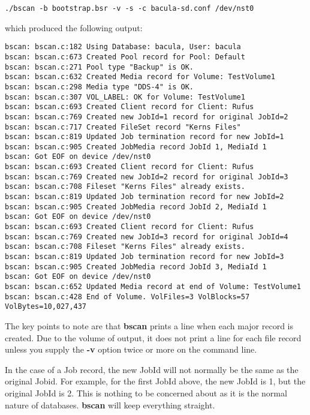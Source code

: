 \footnotesize
\begin{verbatim}
./bscan -b bootstrap.bsr -v -s -c bacula-sd.conf /dev/nst0
\end{verbatim}
\normalsize

which produced the following output:

\footnotesize
\begin{verbatim}
bscan: bscan.c:182 Using Database: bacula, User: bacula
bscan: bscan.c:673 Created Pool record for Pool: Default
bscan: bscan.c:271 Pool type "Backup" is OK.
bscan: bscan.c:632 Created Media record for Volume: TestVolume1
bscan: bscan.c:298 Media type "DDS-4" is OK.
bscan: bscan.c:307 VOL_LABEL: OK for Volume: TestVolume1
bscan: bscan.c:693 Created Client record for Client: Rufus
bscan: bscan.c:769 Created new JobId=1 record for original JobId=2
bscan: bscan.c:717 Created FileSet record "Kerns Files"
bscan: bscan.c:819 Updated Job termination record for new JobId=1
bscan: bscan.c:905 Created JobMedia record JobId 1, MediaId 1
bscan: Got EOF on device /dev/nst0
bscan: bscan.c:693 Created Client record for Client: Rufus
bscan: bscan.c:769 Created new JobId=2 record for original JobId=3
bscan: bscan.c:708 Fileset "Kerns Files" already exists.
bscan: bscan.c:819 Updated Job termination record for new JobId=2
bscan: bscan.c:905 Created JobMedia record JobId 2, MediaId 1
bscan: Got EOF on device /dev/nst0
bscan: bscan.c:693 Created Client record for Client: Rufus
bscan: bscan.c:769 Created new JobId=3 record for original JobId=4
bscan: bscan.c:708 Fileset "Kerns Files" already exists.
bscan: bscan.c:819 Updated Job termination record for new JobId=3
bscan: bscan.c:905 Created JobMedia record JobId 3, MediaId 1
bscan: Got EOF on device /dev/nst0
bscan: bscan.c:652 Updated Media record at end of Volume: TestVolume1
bscan: bscan.c:428 End of Volume. VolFiles=3 VolBlocks=57 VolBytes=10,027,437
\end{verbatim}
\normalsize

The key points to note are that {\bf bscan} prints a line when each major
record is created. Due to the volume of output, it does not print a line for
each file record unless you supply the {\bf -v} option twice or more on the
command line.

In the case of a Job record, the new JobId will not normally be the same as
the original Jobid. For example, for the first JobId above, the new JobId is
1, but the original JobId is 2. This is nothing to be concerned about as it is
the normal nature of databases. {\bf bscan} will keep everything straight.

